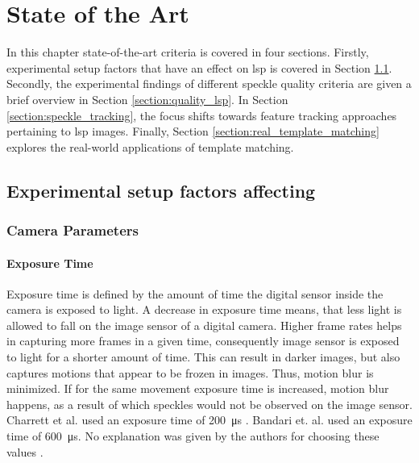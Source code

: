 \chapter{State of the Art}\label{chapter:sota}
In this chapter state-of-the-art criteria is covered in four sections. Firstly, experimental setup factors that have an effect on \gls{lsp} is covered in Section \ref{section:exp_factors}. Secondly, the experimental findings of different speckle quality criteria are given a brief overview in Section \ref{section:quality_lsp}. In Section \ref{section:speckle_tracking}, the focus shifts towards feature tracking approaches pertaining to \gls{lsp} images. Finally, Section \ref{section:real_template_matching} explores the real-world applications of template matching. 


\section{Experimental setup factors affecting }\label{section:exp_factors}

\subsection{Camera Parameters}

    \subsubsection{Exposure Time}\label{subsubsection:Exposure_Time}
    Exposure time is defined by the amount of time the digital sensor inside the camera is exposed to light. A decrease in exposure time means, that less light is allowed to fall on the image sensor of a digital camera. Higher frame rates helps in capturing more frames in a given time, consequently image sensor is exposed to light for a shorter amount of time. This can result in darker images, but also captures motions that appear to be frozen in images. Thus, motion blur is minimized. If for the same movement exposure time is increased, motion blur happens, as a result of which speckles would not be observed on the image sensor. Charrett et al.  used an exposure time of \SI{200}{\micro\second} \cite{charrett_2018}. Bandari et. al. used an exposure time of \SI{600}{\micro\second}. No explanation was given by the authors for choosing these values \cite{bandari}.

